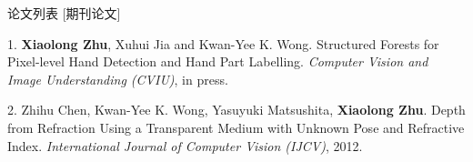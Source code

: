 \documentclass{cv_professional-cn} %
\makeatletter
\newlength{\bibhang}
\newlength{\bibsep}
 {\@listi \global\bibsep\itemsep \global\advance\bibsep by\parsep}
\newenvironment{bibsection}%
        {\vspace{\itemsep}\begin{list}{}{%
       \setlength{\leftmargin}{\bibhang}%
       \setlength{\itemsep}{\bibsep}%
       \setlength{\parsep}{\z@}%
        \setlength{\partopsep}{0pt}%
        \setlength{\topsep}{0pt}}}
        {\end{list}\vspace{\itemsep}}
\makeatother
\begin{document}
\begin{rSection}{论文列表}
[期刊论文]

\begin{bibsection}
	\item[1.] \textbf{Xiaolong Zhu}, Xuhui Jia and Kwan-Yee K. Wong. Structured Forests for Pixel-level Hand Detection and Hand Part Labelling. \emph{Computer Vision and Image Understanding (CVIU)}, in press.
	
    \item[2.] Zhihu Chen, Kwan-Yee K. Wong, Yasuyuki Matsushita, \textbf{Xiaolong Zhu}. Depth from Refraction Using a Transparent Medium with Unknown Pose and Refractive Index. \emph{International Journal of Computer Vision (IJCV)}, 2012.

\end{bibsection}

\end{rSection}



\end{document}
